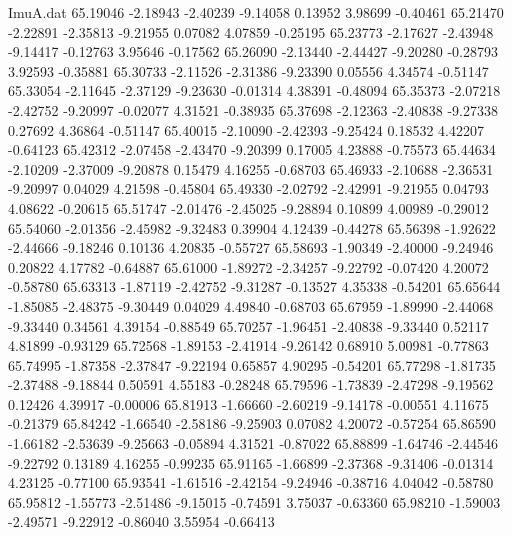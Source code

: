 \begin{filecontents}{ImuA.dat}
  65.19046   -2.18943   -2.40239   -9.14058    0.13952    3.98699   -0.40461
  65.21470   -2.22891   -2.35813   -9.21955    0.07082    4.07859   -0.25195
  65.23773   -2.17627   -2.43948   -9.14417   -0.12763    3.95646   -0.17562
  65.26090   -2.13440   -2.44427   -9.20280   -0.28793    3.92593   -0.35881
  65.30733   -2.11526   -2.31386   -9.23390    0.05556    4.34574   -0.51147
  65.33054   -2.11645   -2.37129   -9.23630   -0.01314    4.38391   -0.48094
  65.35373   -2.07218   -2.42752   -9.20997   -0.02077    4.31521   -0.38935
  65.37698   -2.12363   -2.40838   -9.27338    0.27692    4.36864   -0.51147
  65.40015   -2.10090   -2.42393   -9.25424    0.18532    4.42207   -0.64123
  65.42312   -2.07458   -2.43470   -9.20399    0.17005    4.23888   -0.75573
  65.44634   -2.10209   -2.37009   -9.20878    0.15479    4.16255   -0.68703
  65.46933   -2.10688   -2.36531   -9.20997    0.04029    4.21598   -0.45804
  65.49330   -2.02792   -2.42991   -9.21955    0.04793    4.08622   -0.20615
  65.51747   -2.01476   -2.45025   -9.28894    0.10899    4.00989   -0.29012
  65.54060   -2.01356   -2.45982   -9.32483    0.39904    4.12439   -0.44278
  65.56398   -1.92622   -2.44666   -9.18246    0.10136    4.20835   -0.55727
  65.58693   -1.90349   -2.40000   -9.24946    0.20822    4.17782   -0.64887
  65.61000   -1.89272   -2.34257   -9.22792   -0.07420    4.20072   -0.58780
  65.63313   -1.87119   -2.42752   -9.31287   -0.13527    4.35338   -0.54201
  65.65644   -1.85085   -2.48375   -9.30449    0.04029    4.49840   -0.68703
  65.67959   -1.89990   -2.44068   -9.33440    0.34561    4.39154   -0.88549
  65.70257   -1.96451   -2.40838   -9.33440    0.52117    4.81899   -0.93129
  65.72568   -1.89153   -2.41914   -9.26142    0.68910    5.00981   -0.77863
  65.74995   -1.87358   -2.37847   -9.22194    0.65857    4.90295   -0.54201
  65.77298   -1.81735   -2.37488   -9.18844    0.50591    4.55183   -0.28248
  65.79596   -1.73839   -2.47298   -9.19562    0.12426    4.39917   -0.00006
  65.81913   -1.66660   -2.60219   -9.14178   -0.00551    4.11675   -0.21379
  65.84242   -1.66540   -2.58186   -9.25903    0.07082    4.20072   -0.57254
  65.86590   -1.66182   -2.53639   -9.25663   -0.05894    4.31521   -0.87022
  65.88899   -1.64746   -2.44546   -9.22792    0.13189    4.16255   -0.99235
  65.91165   -1.66899   -2.37368   -9.31406   -0.01314    4.23125   -0.77100
  65.93541   -1.61516   -2.42154   -9.24946   -0.38716    4.04042   -0.58780
  65.95812   -1.55773   -2.51486   -9.15015   -0.74591    3.75037   -0.63360
  65.98210   -1.59003   -2.49571   -9.22912   -0.86040    3.55954   -0.66413

\end{filecontents}
